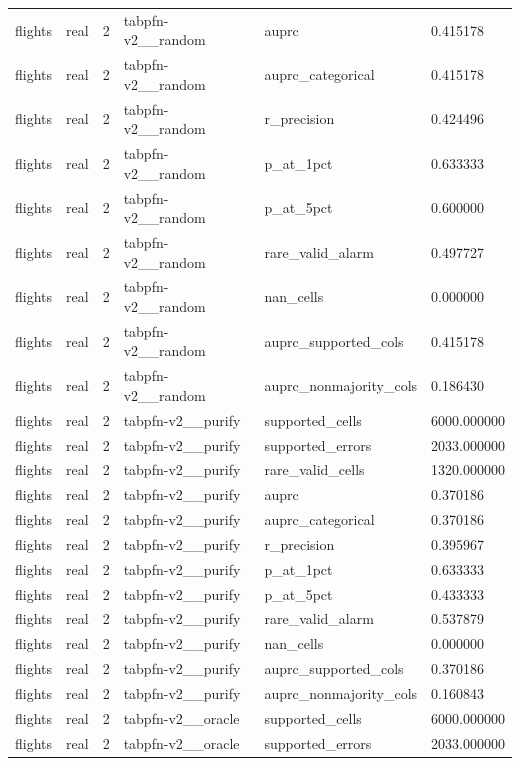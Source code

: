 \begin{tabular}{llllll}
flights & real & 2 & tabpfn-v2\_\_random & auprc & 0.415178 \\
flights & real & 2 & tabpfn-v2\_\_random & auprc\_categorical & 0.415178 \\
flights & real & 2 & tabpfn-v2\_\_random & r\_precision & 0.424496 \\
flights & real & 2 & tabpfn-v2\_\_random & p\_at\_1pct & 0.633333 \\
flights & real & 2 & tabpfn-v2\_\_random & p\_at\_5pct & 0.600000 \\
flights & real & 2 & tabpfn-v2\_\_random & rare\_valid\_alarm & 0.497727 \\
flights & real & 2 & tabpfn-v2\_\_random & nan\_cells & 0.000000 \\
flights & real & 2 & tabpfn-v2\_\_random & auprc\_supported\_cols & 0.415178 \\
flights & real & 2 & tabpfn-v2\_\_random & auprc\_nonmajority\_cols & 0.186430 \\
flights & real & 2 & tabpfn-v2\_\_purify & supported\_cells & 6000.000000 \\
flights & real & 2 & tabpfn-v2\_\_purify & supported\_errors & 2033.000000 \\
flights & real & 2 & tabpfn-v2\_\_purify & rare\_valid\_cells & 1320.000000 \\
flights & real & 2 & tabpfn-v2\_\_purify & auprc & 0.370186 \\
flights & real & 2 & tabpfn-v2\_\_purify & auprc\_categorical & 0.370186 \\
flights & real & 2 & tabpfn-v2\_\_purify & r\_precision & 0.395967 \\
flights & real & 2 & tabpfn-v2\_\_purify & p\_at\_1pct & 0.633333 \\
flights & real & 2 & tabpfn-v2\_\_purify & p\_at\_5pct & 0.433333 \\
flights & real & 2 & tabpfn-v2\_\_purify & rare\_valid\_alarm & 0.537879 \\
flights & real & 2 & tabpfn-v2\_\_purify & nan\_cells & 0.000000 \\
flights & real & 2 & tabpfn-v2\_\_purify & auprc\_supported\_cols & 0.370186 \\
flights & real & 2 & tabpfn-v2\_\_purify & auprc\_nonmajority\_cols & 0.160843 \\
flights & real & 2 & tabpfn-v2\_\_oracle & supported\_cells & 6000.000000 \\
flights & real & 2 & tabpfn-v2\_\_oracle & supported\_errors & 2033.000000 \\

\end{tabular}
